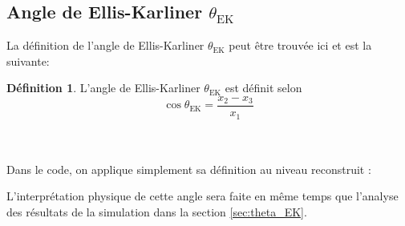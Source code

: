 \documentclass[a4paper]{article} %
\numberwithin{equation}{section} %
\theoremstyle{definition}
\newtheorem{definition}{Définition}[section]
\theoremstyle{remark}
\theoremstyle{plain}%
\theoremstyle{style_exemple}
\newenvironment{formal_def}{%
  \def\FrameCommand{%
    \hspace{0pt}%
    {\color{OliveGreen}\vrule width 2pt}%
    {\color{defshade}\vrule width 4pt}%
    \colorbox{defshade}%
  }%
  \MakeFramed{\advance\hsize-\width\FrameRestore}%
  \noindent\hspace{-4.55pt}%
  \begin{adjustwidth}{}{7pt}%
  \vspace{2pt}\vspace{2pt}%
}
{%
  \vspace{2pt}\end{adjustwidth}\endMakeFramed%
}
\newcommand{\coldef}[1]{\begin{formal_def}
    \begin{definition}
        #1
    \end{definition}
\end{formal_def}}
\begin{document}
\subsection{Angle de Ellis-Karliner $\theta_\text{EK}$}
La définition de l'angle de Ellis-Karliner $\theta_\text{EK}$ peut être trouvée ici \cite{Cours-QCD} et est la suivante:
\coldef{
L'angle de Ellis-Karliner $\theta_\text{EK}$ est définit selon
\begin{equation}
    \cos \theta_\text{EK} = \frac{x_2 - x_3}{x_1}
    \label{eq:thetaEK}
\end{equation}
}
 \cite{Cours-QCD}\\
\\
Dans le code, on applique simplement sa définition au niveau reconstruit :

L'interprétation physique de cette angle sera faite en même temps que l'analyse des résultats de la simulation dans la section \ref{sec:theta_EK}.
\end{document}
